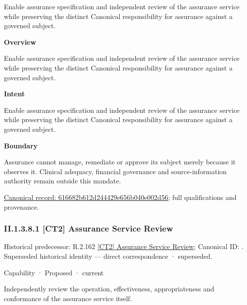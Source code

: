 Enable assurance specification and independent review of the assurance service while preserving the distinct Canonical responsibility for assurance against a governed subject.



\textbf{Overview}



Enable assurance specification and independent review of the assurance service while preserving the distinct Canonical responsibility for assurance against a governed subject.



\textbf{Intent}



Enable assurance specification and independent review of the assurance service while preserving the distinct Canonical responsibility for assurance against a governed subject.



\textbf{Boundary}



Assurance cannot manage, remediate or approve its subject merely because it observes it. Clinical adequacy, financial governance and source-information authority remain outside this mandate.


{\footnotesize \href{../../../../continuum/strategy/capability/616682b612d244429e656b040e002d56.md}{Canonical record: 616682b612d244429e656b040e002d56}; full qualifications and provenance.}\par
\subsubsection*{II.1.3.8.1 [CT2] Assurance Service Review}
\label{navigation:II.1.3.8.1}

{\small Historical predecessor: R.2.162 \hyperref[element:b345cb12b45746409302899514126170]{[CT2] Assurance Service Review}; Canonical ID: \texttt{}. Superseded historical identity — direct correspondence · superseded.}\par
\label{element:b1a791458d644d4794895e4fa42ec83c}
{\small Capability · Proposed · current}\par

Independently review the operation, effectiveness, appropriateness and conformance of the assurance service itself.



